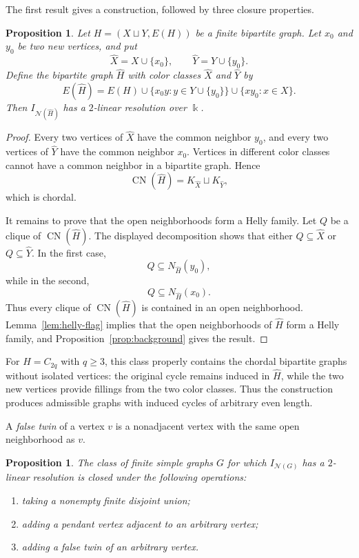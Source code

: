 \documentclass[11pt]{amsart}
\newtheorem{proposition}[theorem]{Proposition}
\theoremstyle{definition}
\theoremstyle{remark}
\numberwithin{equation}{section}
\newcommand{\NN}{\mathcal N}
\newcommand{\CN}{\operatorname{CN}}
\begin{document}
	The first result gives a construction, followed by three closure properties.
	
	\begin{proposition}\label{prop:two-sided-cone}
		Let \(H=(X\sqcup Y,E(H))\) be a finite bipartite graph. Let \(x_0\) and
		\(y_0\) be
		two new vertices, and put
		\[
		\widehat X=X\cup\{x_0\},
		\qquad
		\widehat Y=Y\cup\{y_0\}.
		\]
		Define the bipartite graph \(\widehat H\) with color classes
		\(\widehat X\) and \(\widehat Y\) by
		\[
		E(\widehat H)
		=
		E(H)
		\cup
		\{x_0y:y\in Y\cup\{y_0\}\}
		\cup
		\{xy_0:x\in X\}.
		\]
		Then \(I_{\NN(\widehat H)}\) has a \(2\)-linear resolution over
		\(\Bbbk\).
	\end{proposition}
	
	\begin{proof}
		Every two vertices of \(\widehat X\) have the common neighbor \(y_0\), and
		every two vertices of \(\widehat Y\) have the common neighbor \(x_0\).
		Vertices in different color classes cannot have a common neighbor in a
		bipartite graph. Hence
		\[
		\CN(\widehat H)=K_{\widehat X}\sqcup K_{\widehat Y},
		\]
		which is chordal.
		
		It remains to prove that the open neighborhoods form a Helly family. Let
		\(Q\) be a
		clique of \(\CN(\widehat H)\). The displayed decomposition shows that either
		\(Q\subseteq\widehat X\) or \(Q\subseteq\widehat Y\). In the first case,
		\[
		Q\subseteq N_{\widehat H}(y_0),
		\]
		while in the second,
		\[
		Q\subseteq N_{\widehat H}(x_0).
		\]
		Thus every clique of \(\CN(\widehat H)\) is contained in an open
		neighborhood. Lemma~\ref{lem:helly-flag} implies that the open neighborhoods of
		\(\widehat H\) form a Helly family, and Proposition~\ref{prop:background} gives the
		result.
	\end{proof}
	
	For \(H=C_{2q}\) with \(q\ge3\), this class properly
	contains the chordal bipartite graphs without isolated vertices: the original
	cycle remains induced in \(\widehat H\), while the two new vertices provide
	fillings from the two color classes. Thus the construction produces admissible
	graphs with induced cycles of arbitrary even length.
	
	A \emph{false twin} of a vertex \(v\) is a nonadjacent vertex with the same open neighborhood as \(v\).
	
	\begin{proposition}
		\label{prop:closure-operations}
		The class of finite simple graphs \(G\) for which
		\(I_{\NN(G)}\) has a \(2\)-linear resolution is closed under the
		following operations:
		\begin{enumerate}[label=\textup{(\alph*)}]
			\item taking a nonempty finite disjoint union;
			\item adding a pendant vertex adjacent to an arbitrary vertex;
			\item adding a false twin of an arbitrary vertex.
		\end{enumerate}
	\end{proposition}
	
\end{document}
